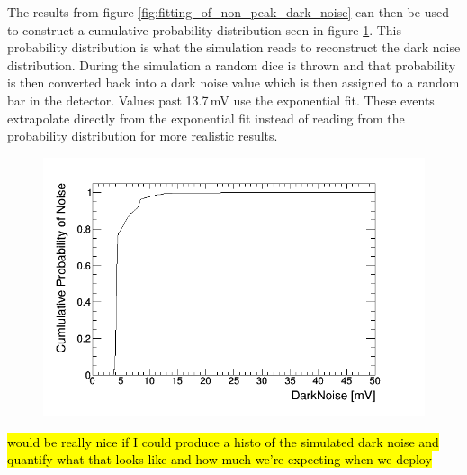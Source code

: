The results from figure \ref{fig:fitting_of_non_peak_dark_noise} can then be used to construct a cumulative probability distribution seen in figure \ref{fig:cumulative_prob_dark}. This probability distribution is what the simulation reads to reconstruct the dark noise distribution. During the simulation a random dice is thrown and that probability is then converted back into a dark noise value which is then assigned to a random bar in the detector. Values past 13.7\,mV use the exponential fit. These events extrapolate directly from the exponential fit instead of reading from the probability distribution for more realistic results. 
\begin{figure}[htbp]
 \centering
 \includegraphics[width=0.8\linewidth]{cumulative_prob_dark_noise.png}
 \label{fig:cumulative_prob_dark}
\end{figure}
\hl{would be really nice if I could produce a histo of the simulated dark noise and quantify what that looks like and how much we're expecting when we deploy}

